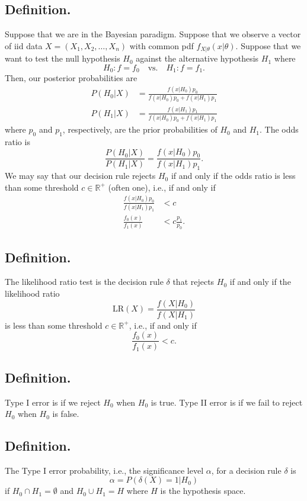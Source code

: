 \documentclass[titlepage]{article}
\begin{document}
\subsection{Definition.} Suppose that we are in the Bayesian paradigm. Suppose that we observe a vector of iid data $X = (X_{1}, X_{2}, \ldots, X_{n})$ with common pdf $f_{X|\theta}(x|\theta)$. Suppose that we want to test the null hypothesis $H_{0}$ against the alternative hypothesis $H_{1}$ where
$$H_{0}: f = f_{0} \quad \text{vs.} \quad H_{1}: f = f_{1}.$$
Then, our posterior probabilities are 
\begin{align*}
    P(H_{0}|X) &= \frac{f(x|H_{0})p_{0}}{f(x|H_{0})p_{0} + f(x|H_{1})p_{1}} \\
    P(H_{1}|X) &= \frac{f(x|H_{1})p_{1}}{f(x|H_{0})p_{0} + f(x|H_{1})p_{1}}
\end{align*}
where $p_{0}$ and $p_{1}$, respectively, are the prior probabilities of $H_{0}$ and $H_{1}$. The odds ratio is 
$$\frac{P(H_{0}|X)}{P(H_{1}|X)} = \frac{f(x|H_{0})p_{0}}{f(x|H_{1})p_{1}}.$$
We may say that our decision rule rejects $H_{0}$ if and only if the odds ratio is less than some threshold $c \in \mathbb{R}^{+}$ (often one), i.e., if and only if 
\begin{align*}
    \frac{f(x|H_{0})p_{0}}{f(x|H_{1})p_{1}} &< c \\
                  \frac{f_{0}(x)}{f_{1}(x)} &< c\frac{p_{1}}{p_{0}}.
\end{align*}

\subsection{Definition.} The likelihood ratio test is the decision rule $\delta$ that rejects $H_{0}$ if and only if the likelihood ratio 
$$\text{LR}(X) = \frac{f(X|H_{0})}{f(X|H_{1})}$$
is less than some threshold $c \in \mathbb{R}^{+}$, i.e., if and only if 
$$\frac{f_{0}(x)}{f_{1}(x)} < c.$$

\subsection{Definition.} Type I error is if we reject $H_{0}$ when $H_{0}$ is true. Type II error is if we fail to reject $H_{0}$ when $H_{0}$ is false.

\subsection{Definition.} The Type I error probability, i.e., the significance level $\alpha$, for a decision rule $\delta$ is 
$$\alpha = P(\delta(X)=1|H_{0})$$
if $H_{0} \cap H_{1} = \emptyset$ and $H_{0} \cup H_{1} = H$ where $H$ is the hypothesis space.
\end{document}
